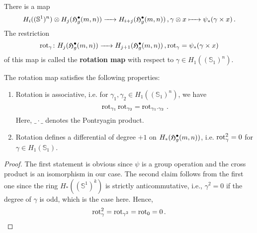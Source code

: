 \begin{defi}
   There is a map 
   \[
       H_i((\mathbb S^1)^n) \otimes H_j(\mathfrak{H}^{\bullet}_g(m, n)) \xrightarrow{\hspace{6pt}{}\hspace{6pt}} H_{i+j}(\mathfrak{H}^{\bullet}_g(m, n))\,, \gamma \otimes x \xmapsto{\hspace{6pt}{}\hspace{6pt}} \psi_*(\gamma \times x)\,.
   \]
   The restriction 
   \[
       \operatorname{rot}_\gamma \colon H_j(\mathfrak{H}^{\bullet}_g(m, n)) \xrightarrow{\hspace{6pt}{}\hspace{6pt}} H_{j+1}(\mathfrak{H}^{\bullet}_g(m, n))\,, \operatorname{rot}_\gamma = \psi_*(\gamma \times x)
   \]
   of this map is called the \textbf{rotation map} with respect to $\gamma \in H_1((\mathbb S_1)^n)$.
\end{defi}

\begin{prop}
   The rotation map satisfies the following properties:
   \begin{enumerate}
    \item Rotation is associative, i.e. for $\gamma_1, \gamma_2 \in H_1((\mathbb S_1)^n)$, we have
    \[
       \operatorname{rot}_{\gamma_1} \operatorname{rot}_{\gamma_2} = \operatorname{rot}_{\gamma_1 \cdot \gamma_2}\,.
    \]
    Here, $\_\cdot\_$ denotes the Pontryagin product.
    \item Rotation defines a differential of degree $+1$ on $H_*(\mathfrak{H}^{\bullet}_g(m, n))$, i.e. $\operatorname{rot}_\gamma^2 = 0$ for $\gamma \in H_1(\mathbb S_1)$.
   \end{enumerate}
    \begin{proof}
       The first statement is obvious since $\psi$ is a group operation and the cross product is an isomorphism in our case.
       The second claim follows from the first one since the ring $H_*((\mathbb S^1)^k)$ is strictly anticommutative, i.e.,
       $\gamma^2 = 0$ if the degree of $\gamma$ is odd, which is the case here.
       Hence,
       \[
           \operatorname{rot}_\gamma^2 = \operatorname{rot}_{\gamma^2} = \operatorname{rot}_0 = 0\,. 
       \]
       
    \end{proof}
\end{prop}

